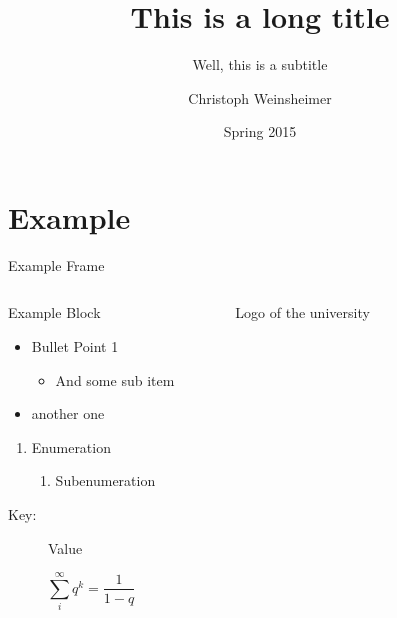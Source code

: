 \documentclass[%
    aspectratio=169,  %
]{beamer}
\title[Short Title]{This is a long title}
\subtitle{Well, this is a subtitle}
\author{Christoph Weinsheimer}
\institute[Uni Mainz]
{%
    Johannes Gutenberg-University Mainz
}
\date{Spring 2015}
\begin{document}
\maketitle



\section{Example}

\begin{frame}{Example Frame}
  \begin{columns}
      \begin{block}{Example Block}
        \begin{itemize}
          \item Bullet Point 1
            \begin{itemize}
              \item And some sub item
            \end{itemize}
          \item another one
        \end{itemize}
        \begin{enumerate}
          \item Enumeration
            \begin{enumerate}
              \item Subenumeration
            \end{enumerate}
        \end{enumerate}
        \begin{description}
            \item[Key:] Value
        \end{description}
        \begin{center}
          \[
            \sum_i^\infty q^k = \frac{1}{1-q}
          \]
        \end{center}
      \end{block}
      \begin{figure}[ht]
        \centering
        \caption{Logo of the university}
      \end{figure}
  \end{columns}
\end{frame}
\end{document}
